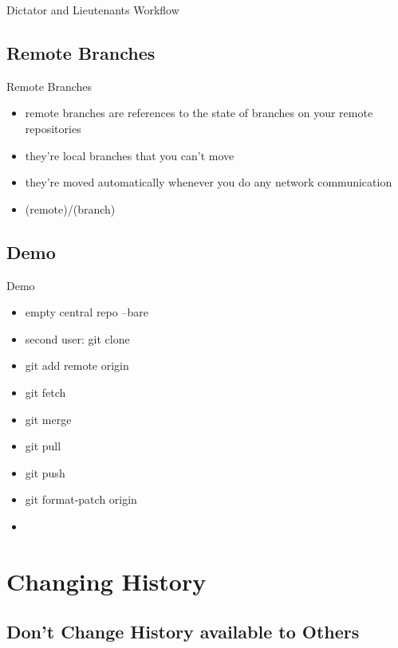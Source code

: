 \documentclass{beamer}
\begin{document}
\begin{frame}{Dictator and Lieutenants Workflow}
    \centering
    \hfill\vfill
\end{frame}

\subsection{Remote Branches}

\begin{frame}{Remote Branches}
  \begin{itemize}
    \item
      remote branches are references to the state of branches on your remote repositories
    \item
      they're local branches that you can't move
    \item
      they're moved automatically whenever you do any network communication
    \item
      (remote)/(branch)
  \end{itemize}
\end{frame}

\subsection{Demo}

\begin{frame}{Demo}
  \begin{itemize}
    \item
      empty central repo --bare
    \item
      second user: git clone
    \item
      git add remote origin
    \item
      git fetch
    \item
      git merge
    \item
      git pull
    \item
      git push
    \item
      git format-patch origin
    \item
  \end{itemize}
\end{frame}

\section{Changing History}

\subsection{Don't Change History available to Others}
\end{document}

